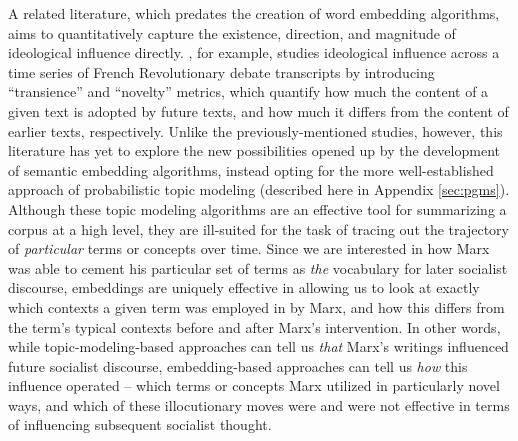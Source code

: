 \documentclass[11pt]{article}
\begin{document}
A related literature, which predates the creation of word embedding algorithms, aims to quantitatively capture the existence, direction, and magnitude of ideological influence directly. \cite{barron_individuals_2018}, for example, studies ideological influence across a time series of French Revolutionary debate transcripts by introducing ``transience'' and ``novelty'' metrics, which quantify how much the content of a given text is adopted by future texts, and how much it differs from the content of earlier texts, respectively. Unlike the previously-mentioned studies, however, this literature has yet to explore the new possibilities opened up by the development of semantic embedding algorithms, instead opting for the more well-established approach of probabilistic topic modeling (described here in Appendix \ref{sec:pgms}).
Although these topic modeling algorithms are an effective tool for summarizing a corpus at a high level, they are ill-suited for the task of tracing out the trajectory of \textit{particular} terms or concepts over time. Since we are interested in how Marx was able to cement his particular set of terms as \textit{the} vocabulary for later socialist discourse, embeddings are uniquely effective in allowing us to look at exactly which contexts a given term was employed in by Marx, and how this differs from the term's typical contexts before and after Marx's intervention. In other words, while topic-modeling-based approaches can tell us \textit{that} Marx's writings influenced future socialist discourse, embedding-based approaches can tell us \textit{how} this influence operated -- which terms or concepts Marx utilized in particularly novel ways, and which of these illocutionary moves were and were not effective in terms of influencing subsequent socialist thought.
\end{document}
